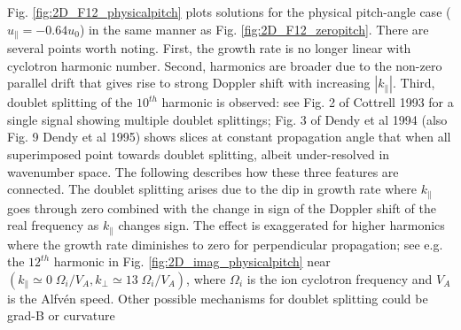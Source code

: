 \documentclass[12pt]{iopart}
\begin{document}
Fig. \ref{fig:2D_F12_physicalpitch} plots solutions for the physical pitch-angle
case ($u_\parallel = -0.64 u_0$) in the same manner as Fig.
\ref{fig:2D_F12_zeropitch}. There are several points worth noting. First, the
growth rate is no longer linear with cyclotron harmonic number. Second,
harmonics are broader due to the non-zero parallel drift that gives rise to
strong Doppler shift with increasing $|k_\parallel|$. Third, doublet splitting
of the $10^{th}$ harmonic is observed: see Fig. 2 of Cottrell 1993 for a single
signal showing multiple doublet splittings; Fig. 3 of Dendy et al 1994 (also
Fig. 9 Dendy et al 1995) shows slices at constant propagation angle that when
all superimposed point towards doublet splitting, albeit under-resolved in
wavenumber space. The following describes how these three features are
connected. The doublet splitting arises due to the dip in growth rate where
$k_\parallel$ goes through zero combined with the change in sign of the Doppler
shift of the real frequency as $k_\parallel$ changes sign. The effect is
exaggerated for higher harmonics where the growth rate diminishes to zero for
perpendicular propagation; see e.g. the $12^{th}$ harmonic in Fig.
\ref{fig:2D_imag_physicalpitch} near $(k_\parallel \simeq 0\; \Omega_{i}/V_A,
k_\bot \simeq 13\; \Omega_{i}/V_A)$, where $\Omega_{i}$ is the ion cyclotron
frequency and $V_A$ is the Alfv{\'e}n speed. Other possible mechanisms for
doublet splitting could be grad-B or curvature
\end{document}
